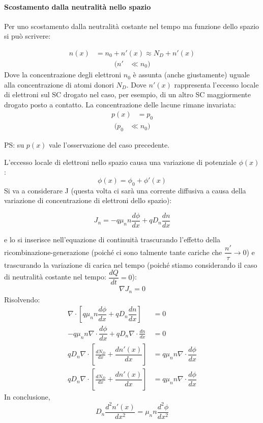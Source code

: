 \paragraph{Scostamento dalla neutralità nello spazio}
Per uno scostamento dalla neutralità costante nel tempo ma funzione dello spazio si può scrivere:

\begin{align}
    n(x)&=n_0+n'(x)\approx N_D+n'(x)
\end{align}
\begin{align*}
    (n'&\ll n_0 )
\end{align*}
Dove la concentrazione degli elettroni $n_0$ è assunta (anche giustamente) uguale alla concentrazione di atomi donori $N_D$.
Dove $n'(x)$ rappresenta l'eccesso locale di elettroni sul SC drogato nel caso, per esempio, di un altro SC maggiormente drogato posto a contatto.
La concentrazione delle lacune rimane invariata:
\begin{align}
    p(x)&=p_0
\end{align}
\begin{align*}
    (p_0&\ll n_0)
\end{align*}

PS: su $p(x)$ vale l'osservazione del caso precedente.

L'eccesso locale di elettroni nello spazio causa una variazione di potenziale $\phi(x)$:
\begin{equation}
    \phi(x)=\phi_0+\phi'(x)
\end{equation}
Si va a considerare J (questa volta ci sarà una corrente diffusiva a causa della variazione di concentrazione di elettroni dello spazio):

\begin{equation}
    J_n=-q \mu_n n \dfrac{d\phi}{dx}+qD_n \frac{dn}{dx}
\end{equation}

e lo si inserisce nell'equazione di continuità trascurando l'effetto della ricombinazione-generazione (poiché ci sono talmente tante cariche che $ \dfrac{n'}{\tau}\rightarrow 0$) e trascurando la variazione di carica nel tempo (poiché stiamo considerando il caso di neutralità costante nel tempo: $\dfrac{dQ}{dt}=0$):
\begin{align}
    \nabla J_n=0
\end{align}
Risolvendo:
\begin{align}
    \nabla \cdot \left[ q \mu_n n \dfrac{d \phi}{dx} + q D_n \dfrac{dn}{dx}\right] &=0 \nonumber\\
    -q \mu_n n \nabla \cdot \dfrac{d\phi}{dx}       + qD_n \nabla \cdot \frac{dn}{dx}&=0 \nonumber\\
    qD_n \nabla \cdot \left[ \frac{dN_D}{dx} + \dfrac{dn'(x)}{dx} \right] &= q \mu_n n \nabla \cdot
    \dfrac{d\phi}{dx} \nonumber\\
    qD_n \nabla \cdot \left[ \frac{dN_D}{dx} + \dfrac{dn'(x)}{dx} \right] &= q \mu_n n \nabla \cdot 
    \dfrac{d\phi}{dx} \nonumber
\end{align}
In conclusione, 
\begin{equation}
    D_n \dfrac{d^2 n'(x)}{dx^2}= \mu_n n \dfrac{d^2\phi}{dx^2}
\end{equation}

